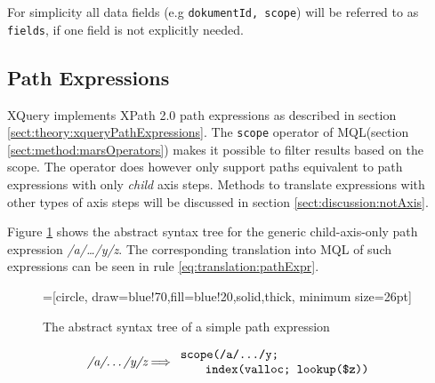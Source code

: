 For simplicity all data fields (e.g \verb!dokumentId, scope!) will be referred
to as \verb!fields!, if one field is not explicitly needed.

\subsection{Path Expressions}
\label{sect:translation:smpPathExpr}
XQuery implements XPath 2.0 path expressions as described in section
\ref{sect:theory:xqueryPathExpressions}. The \texttt{scope} operator of
MQL(section \ref{sect:method:marsOperators}) makes it possible to
filter results based on the scope. The operator does however only support paths
equivalent to path expressions with only \textit{child} axis steps. Methods to
translate expressions with other types of axis steps will be discussed in
section \ref{sect:discussion:notAxis}.

Figure \ref{fig:translation:pathAST} shows the abstract syntax tree for the
generic child-axis-only path expression \textit{/a/\ldots/y/z}. The
corresponding translation into MQL of such expressions can be seen in rule
\ref{eq:translation:pathExpr}.


\begin{figure}[h]
\centering
{}=[circle, draw=blue!70,fill=blue!20,solid,thick, minimum
size=26pt]
\label{fig:translation:pathAST}
\caption[AST of path expression]{The abstract syntax tree of a simple path
expression}
\end{figure}


\begin{equation}
\centering
\textit{/a/\ldots/y/z}
\Longrightarrow
\begin{array}{l}
	\mbox{\texttt{scope(/a/\ldots/y;}} \\
	\qquad \mbox{\texttt{index(valloc; lookup(\$z))}}
\end{array}
\label{eq:translation:pathExpr}
\end{equation}


